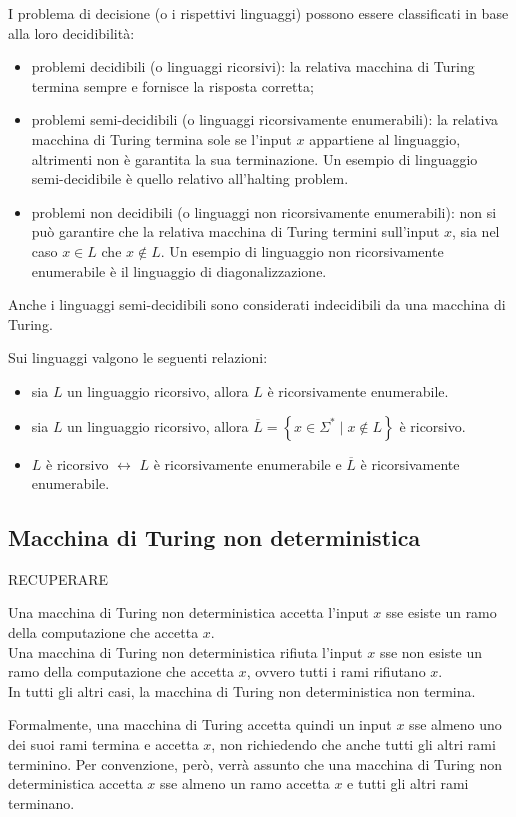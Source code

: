 I problema di decisione (o i rispettivi linguaggi) possono essere classificati in base alla loro decidibilità:
\begin{itemize}
    \item problemi decidibili (o linguaggi ricorsivi): la relativa macchina di Turing termina sempre e fornisce la risposta corretta;
    \item problemi semi-decidibili (o linguaggi ricorsivamente enumerabili): la relativa macchina di Turing termina sole se l'input $x$ appartiene al linguaggio, altrimenti non è garantita la sua terminazione. Un esempio di linguaggio semi-decidibile è quello relativo all'halting problem.
    \item problemi non decidibili (o linguaggi non ricorsivamente enumerabili): non si può garantire che la relativa macchina di Turing termini sull'input $x$, sia nel caso $x \in L$ che $x \notin L$. Un esempio di linguaggio non ricorsivamente enumerabile è il linguaggio di diagonalizzazione.
\end{itemize}
Anche i linguaggi semi-decidibili sono considerati indecidibili da una macchina di Turing.

Sui linguaggi valgono le seguenti relazioni:
\begin{itemize}
    \item sia $L$ un linguaggio ricorsivo, allora $L$ è ricorsivamente enumerabile.
    \item sia $L$ un linguaggio ricorsivo, allora $\overline{L} = \left\{ x \in \Sigma^* \; | \; x \notin L \right\}$ è ricorsivo.
    \item $L$ è ricorsivo $\leftrightarrow$ $L$ è ricorsivamente enumerabile e $\overline{L}$ è ricorsivamente enumerabile.
\end{itemize}

\subsection*{Macchina di Turing non deterministica}
RECUPERARE

Una macchina di Turing non deterministica accetta l'input $x$ sse esiste un ramo della computazione che accetta $x$.\\
Una macchina di Turing non deterministica rifiuta l'input $x$ sse non esiste un ramo della computazione che accetta $x$, ovvero tutti i rami rifiutano $x$.\\
In tutti gli altri casi, la macchina di Turing non deterministica non termina.

Formalmente, una macchina di Turing accetta quindi un input $x$ sse almeno uno dei suoi rami termina e accetta $x$, non richiedendo che anche tutti gli altri rami terminino. Per convenzione, però, verrà assunto che una macchina di Turing non deterministica accetta $x$ sse almeno un ramo accetta $x$ e tutti gli altri rami terminano.

